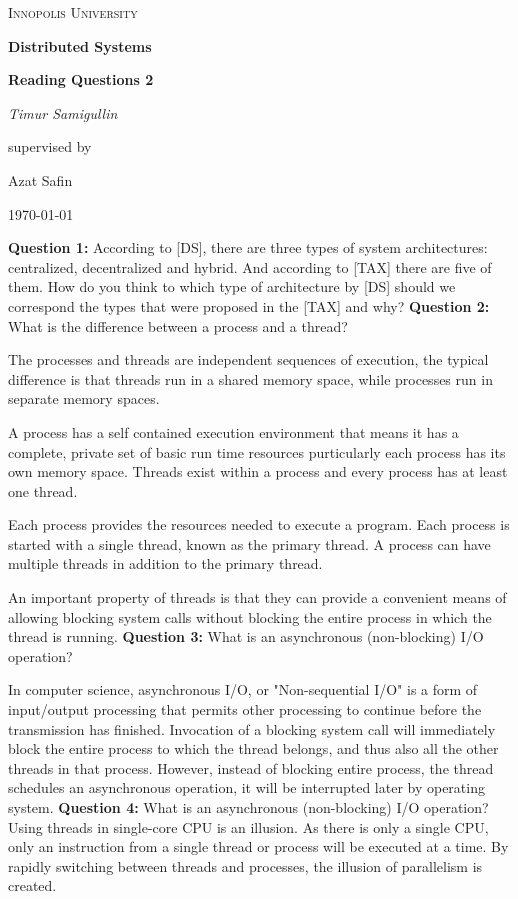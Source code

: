 \documentclass[12pt,a4paper]{report}
\begin{document}
\begin{titlepage}
	\centering
	{\scshape\LARGE Innopolis University \par}
	\vspace{1cm}
	{\huge\bfseries Distributed Systems\par}
	{\huge\bfseries Reading Questions 2\par}
	\vspace{2cm}
	{\Large\itshape Timur Samigullin\par}
	\vfill
	supervised by\par
	Azat Safin
	\vfill
	{\large \today\par}
\end{titlepage}

\textbf{Question 1:} According to [DS], there are three types of system architectures: centralized, decentralized and hybrid. And according to [TAX] there are five of them. How do you think to which type of architecture by [DS] should we correspond the
types that were proposed in the [TAX] and why?
\bigbreak
\textbf{Question 2:} What is the difference between a process and a thread?

The processes and threads are independent sequences of execution, the typical difference is that threads run in a shared memory space, while processes run in separate memory spaces.

A process has a self contained execution environment that means it has a complete, private set of basic run time resources purticularly each process has its own memory space. Threads exist within a process and every process has at least one thread.

Each process provides the resources needed to execute a program. Each process is started with a single thread, known as the primary thread. A process can have multiple threads in addition to the primary thread.

An important property of threads is that they can provide a convenient means of allowing blocking system calls without blocking the entire process in which the thread is running.
\bigbreak
\textbf{Question 3:} What is an asynchronous (non-blocking) I/O operation?

In computer science, asynchronous I/O, or "Non-sequential I/O" is a form of input/output processing that permits other processing to continue before the transmission has finished. \cite{wiki_asynchronous} 
Invocation of a blocking system call will immediately block the entire process to which the thread belongs, and thus also all the other threads in that process. However, instead of blocking entire process, the thread schedules an asynchronous operation, it will be interrupted later by operating system.
\bigbreak
\textbf{Question 4:} What is an asynchronous (non-blocking) I/O operation?
Using threads in single-core CPU is an illusion. As there is only a single CPU, only an instruction from a single thread or process will be executed at a time. By rapidly switching between threads and processes, the illusion of parallelism is created.
\end{document}
